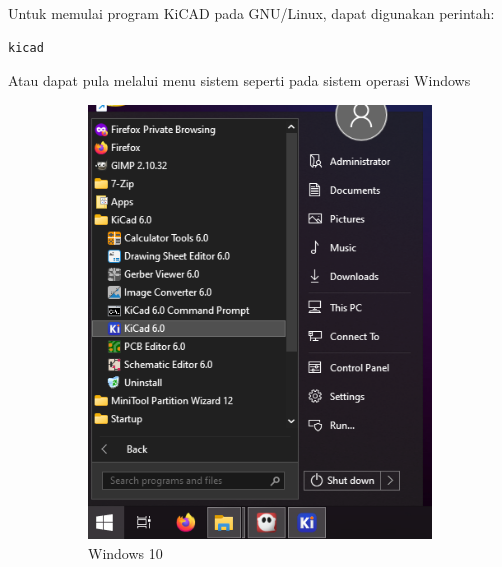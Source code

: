 \documentclass[12pt]{book}
\begin{document}
	Untuk memulai program KiCAD pada GNU/Linux, dapat digunakan perintah:
	\begin{lstlisting}
kicad
	\end{lstlisting}

	Atau dapat pula melalui menu sistem seperti pada sistem operasi Windows

	\begin{figure}[!ht]
		\centering
		\begin{subfigure}[t]{0.4\textwidth}
			\includegraphics[width=\textwidth]{images/installations/kicad_menu_all}
			\caption{Windows 10}
		\end{subfigure}
		\begin{subfigure}[t]{0.4\textwidth}

\end{subfigure}
\end{figure}
\end{document}
